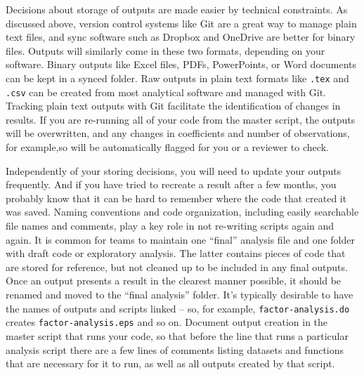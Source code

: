 Decisions about storage of outputs are made easier by technical constraints.
As discussed above, version control systems like Git are a great way to manage
plain text files, and sync software such as Dropbox and OneDrive are better for binary files.
Outputs will similarly come in these two formats, depending on your software.
Binary outputs like Excel files, PDFs, PowerPoints, or Word documents can be kept in a synced folder.
Raw outputs in plain text formats like \texttt{.tex} and \texttt{.csv}
can be created from most analytical software and managed with Git.
Tracking plain text outputs with Git facilitate the identification of changes in results.
If you are re-running all of your code from the master script,
the outputs will be overwritten,
and any changes in coefficients and number of observations, for example,so
will be automatically flagged for you or a reviewer to check.

Independently of your storing decisions,
you will need to update your outputs frequently.
And if you have tried to recreate a result after a few months,
you probably know that it can be hard to remember where the code that created it was saved.
Naming conventions and code organization,
including easily searchable file names and comments,
play a key role in not re-writing scripts again and again.
It is common for teams to maintain one ``final'' analysis file
and one folder with draft code or exploratory analysis.
The latter contains pieces of code that are stored for reference,
but not cleaned up to be included in any final outputs.
Once an output presents a result in the clearest manner possible,
it should be renamed and moved to the ``final analysis'' folder.
It's typically desirable to have the names of outputs and scripts linked --
so, for example, \texttt{factor-analysis.do} creates \texttt{factor-analysis.eps} and so on.
Document output creation in the master script that runs your code,
so that before the line that runs a particular analysis script
there are a few lines of comments listing
datasets and functions that are necessary for it to run,
as well as all outputs created by that script.


